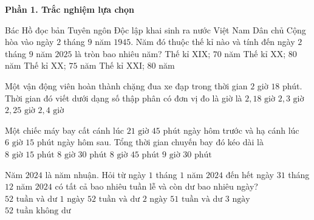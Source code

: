 \textbf{Phần 1. Trắc nghiệm lựa chọn}

\begin{ex} %
Bác Hồ đọc bản Tuyên ngôn Độc lập khai sinh ra nước Việt Nam Dân chủ Cộng hòa vào ngày $2$ tháng $9$ năm $1945$. Năm đó thuộc thế kỉ nào và tính đến ngày $2$ tháng $9$ năm $2025$ là tròn bao nhiêu năm?
\choice
{Thế kỉ XIX; $70$ năm}
{\True Thế kỉ XX; $80$ năm}
{Thế kỉ XX; $75$ năm}
{Thế kỉ XXI; $80$ năm}
\end{ex}

\begin{ex} %
Một vận động viên hoàn thành chặng đua xe đạp trong thời gian $2$ giờ $18$ phút. Thời gian đó viết dưới dạng số thập phân có đơn vị đo là giờ là
\choice
{$2{,}18\text{ giờ}$}
{\True $2{,}3\text{ giờ}$}
{$2{,}25\text{ giờ}$}
{$2{,}4\text{ giờ}$}
\end{ex}

\begin{ex} %
Một chiếc máy bay cất cánh lúc $21\text{ giờ } 45\text{ phút}$ ngày hôm trước và hạ cánh lúc $6\text{ giờ } 15\text{ phút}$ ngày hôm sau. Tổng thời gian chuyến bay đó kéo dài là
\choice
{$8\text{ giờ } 15\text{ phút}$}
{\True $8\text{ giờ } 30\text{ phút}$}
{$8\text{ giờ } 45\text{ phút}$}
{$9\text{ giờ } 30\text{ phút}$}
\end{ex}

\begin{ex} %
Năm $2024$ là năm nhuận. Hỏi từ ngày $1$ tháng $1$ năm $2024$ đến hết ngày $31$ tháng $12$ năm $2024$ có tất cả bao nhiêu tuần lễ và còn dư bao nhiêu ngày?
\choice
{$52\text{ tuần và dư } 1\text{ ngày}$}
{\True $52\text{ tuần và dư } 2\text{ ngày}$}
{$51\text{ tuần và dư } 3\text{ ngày}$}
{$52\text{ tuần không dư}$}
\end{ex}

